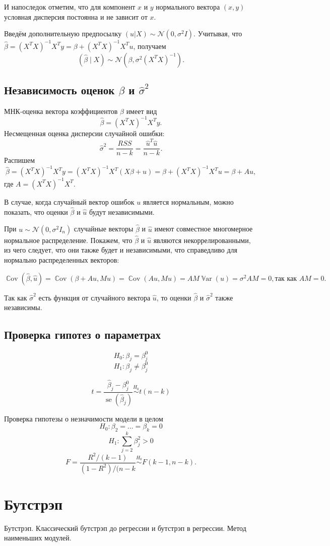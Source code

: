 \documentclass[12pt]{article}
\DeclareMathOperator{\Cov}{\mathbb{C}ov}
\DeclareMathOperator{\Var}{\mathbb{V}ar}
\DeclareMathOperator{\se}{se}
\newcommand{\cN}{\mathcal{N}}
\renewcommand{\b}{\beta}
\newcommand{\hb}{\hat{\beta}}
\renewcommand{\u}{u}
\newcommand{\hu}{\hat{u}}
\newcommand{\RSS}{RSS}
\begin{document}
И напоследок отметим, что для компонент $x$ и $y$ нормального вектора $(x, y)$ условная дисперсия постоянна и не зависит от $x$. 





Введём дополнительную предпосылку $(\u|X) \sim \cN(0, \sigma^2 I)$.
Учитывая, что $\hb = (X^T X)^{-1}X^T y = \b + (X^T X)^{-1}X^T u$, получаем
\[
(\hb \mid X) \sim \cN(\beta, \sigma^2(X^T X)^{-1}).
\]

\subsection{Независимость оценок $\b$ и $\hat\sigma^2$}
МНК-оценка вектора коэффициентов $\b$ имеет вид
\[
\hb = (X^TX)^{-1}X^{T}y.
\]
Несмещенная оценка дисперсии случайной ошибки:
\[
\hat\sigma^2 = \frac{\RSS}{n-k} = \frac{\hu^T \hu}{n-k}.
\]
Распишем
\[
\hb = (X^TX)^{-1}X^{T}y = (X^TX)^{-1}X^{T}(X\b+u) = \b + (X^TX)^{-1}X^{T}u = \b + Au,
\]
где $A = (X^TX)^{-1}X^{T}$.

В случае, когда случайный вектор ошибок $u$ является нормальным, можно показать, что оценки $\hb$ и $\hu$ будут независимыми.

При $u \sim \cN(0,\sigma^2I_n)$ случайные векторы $\hb$ и $\hu$ имеют совместное многомерное нормальное распределение. Покажем, что  $\hb$ и $\hu$ являются некоррелированными, из чего следует, что они также будет и независимыми, что справедливо для нормально распределенных векторов:

\[
\Cov(\hb,\hu) = \Cov(\b + Au, Mu) = \Cov(Au,Mu) = AM\Var(u) = \sigma^2AM = 0, \textbf{так как } AM=0.
\]

Так как $\hat\sigma^2$ есть функция от случайного вектора $\hu$, то оценки $\hb$ и $\hat\sigma^2$ также независимы.

\subsection{Проверка гипотез о параметрах}
\[
H_0: \b_j = \b_j^0
\]
\[
H_1: \b_j \neq \b_j^0
\]

\[
t = \frac{\hb_j - \b_j^0}{\se(\hb_j)} \overset{H_0}{\sim} t(n-k)
\]

Проверка гипотезы о незначимости модели в целом
\[
H_0: \b_2 = \dots =\b_k = 0
\]
\[
H_1: \sum_{j=2}^k \b_j^2 > 0
\]
\[
F = \frac{R^2 / (k-1)}{(1 - R^2)/(n-k} \overset{H_0}{\sim} F(k-1,n-k).
\]
\section{Бутстрэп}
Бутстрэп. Классический бутстрэп до регрессии и бутстрэп в регрессии. Метод наименьших модулей.
\end{document}

